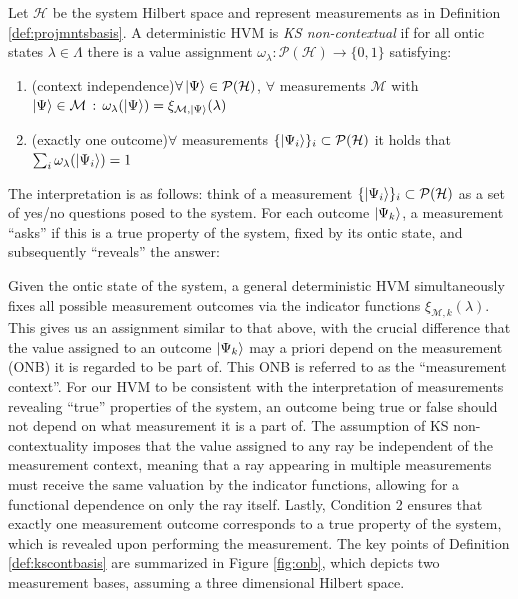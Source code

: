 \begin{definition}
\label{def:kscontbasis}
Let $\mathcal{H}$ be the system Hilbert space and represent measurements as in Definition \ref{def:projmntsbasis}. A deterministic HVM is \emph{KS non-contextual} if for all ontic states $\lambda\in\Lambda$ there is a value assignment $\omega_{\lambda}:\mathcal{P}(\mathcal{H})\rightarrow\{0,1\}$ satisfying:
\begin{enumerate}
    \item (context independence)\hfill\break$\forall\ket{\Psi} \in\mathcal{P}(\mathcal{H})$, $\forall$ measurements $\mathcal{M}$ with $\ket{\Psi} \in\mathcal{M}\thinspace:\thinspace \omega_{\lambda}(\ket{\Psi} )=\xi_{\mathcal{M},\ket{\Psi} }(\lambda)$
    \item (exactly one outcome)\hfill\break $\forall$ measurements $\{\ket{\Psi_{i}} \}_{i}\subset\mathcal{P}(\mathcal{H})$ it holds that $\sum_{i}\omega_{\lambda}(\ket{\Psi_{i}})=1$
\end{enumerate}
\end{definition}

The interpretation is as follows: think of a measurement $\{\ket{\Psi_{i}} \}_{i}\subset\mathcal{P}(\mathcal{H})$ as a set of yes/no questions posed to the system. For each outcome $\ket{\Psi_{k}}$, a measurement ``asks” if this is a true property of the system, fixed by its ontic state, and subsequently ``reveals” the answer:

Given the ontic state of the system, a general deterministic HVM simultaneously fixes all possible measurement outcomes via the indicator functions $\xi_{\mathcal{M},k}(\lambda)$. This gives us an assignment similar to that above, with the crucial difference that the value assigned to an outcome $\ket{\Psi_{k}}$  may a priori depend on the measurement (ONB) it is regarded to be part of. This ONB is referred to as the ``measurement context”. For our HVM to be consistent with the interpretation of measurements revealing ``true” properties of the system, an outcome being true or false should not depend on what measurement it is a part of. The assumption of KS non-contextuality imposes that the value assigned to any ray be independent of the measurement context, meaning that a ray appearing in multiple measurements must receive the same valuation by the indicator functions, allowing for a functional dependence on only the ray itself. Lastly, Condition 2 ensures that exactly one measurement outcome corresponds to a true property of the system, which is revealed upon performing the measurement. The key points of Definition \ref{def:kscontbasis} are summarized in Figure \ref{fig:onb}, which depicts two measurement bases, assuming a three dimensional Hilbert space.

